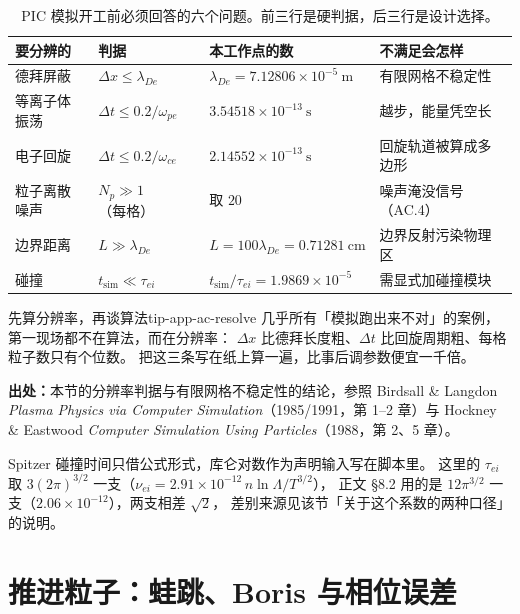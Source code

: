 \begin{table}[htbp]
\centering
\small
\caption{PIC 模拟开工前必须回答的六个问题。前三行是硬判据，后三行是设计选择。}
\label{tab:app-ac-resolution}
\begin{tabular}{p{2.4cm}p{3.2cm}p{3.5cm}p{4.2cm}}
\toprule
要分辨的 & 判据 & 本工作点的数 & 不满足会怎样 \\
\midrule
德拜屏蔽 & $\Delta x\le\lambda_{De}$ & $\lambda_{De}=7.12806\times10^{-5}\ \mathrm{m}$ & 有限网格不稳定性 \\
等离子体振荡 & $\Delta t\le0.2/\omega_{pe}$ & $3.54518\times10^{-13}\ \mathrm{s}$ & 越步，能量凭空长 \\
电子回旋 & $\Delta t\le0.2/\omega_{ce}$ & $2.14552\times10^{-13}\ \mathrm{s}$ & 回旋轨道被算成多边形 \\
粒子离散噪声 & $N_p\gg1$（每格） & 取 $20$ & 噪声淹没信号（AC.4） \\
边界距离 & $L\gg\lambda_{De}$ & $L=100\lambda_{De}=0.71281\ \mathrm{cm}$ & 边界反射污染物理区 \\
碰撞 & $t_{\mathrm{sim}}\ll\tau_{ei}$ & $t_{\mathrm{sim}}/\tau_{ei}=1.9869\times10^{-5}$ & 需显式加碰撞模块 \\
\bottomrule
\end{tabular}

\end{table}

\begin{tip}{先算分辨率，再谈算法}{tip-app-ac-resolve}
几乎所有「模拟跑出来不对」的案例，第一现场都不在算法，而在分辨率：
$\Delta x$ 比德拜长度粗、$\Delta t$ 比回旋周期粗、每格粒子数只有个位数。
把这三条写在纸上算一遍，比事后调参数便宜一千倍。
\end{tip}

{\footnotesize
\textbf{出处：}本节的分辨率判据与有限网格不稳定性的结论，参照 Birdsall \& Langdon
\emph{Plasma Physics via Computer Simulation}（1985/1991，第 1--2 章）与
Hockney \& Eastwood \emph{Computer Simulation Using Particles}（1988，第 2、5 章）。

Spitzer 碰撞时间只借公式形式，库仑对数作为声明输入写在脚本里。
这里的 $\tau_{ei}$ 取 $3(2\pi)^{3/2}$ 一支（$\nu_{ei}=2.91\times10^{-12}\,n\ln\Lambda/T^{3/2}$），
正文 §8.2 用的是 $12\pi^{3/2}$ 一支（$2.06\times10^{-12}$），两支相差 $\sqrt2$，
差别来源见该节「关于这个系数的两种口径」的说明。
}

\section{推进粒子：蛙跳、Boris 与相位误差}
\label{sec:app-ac-pusher}


